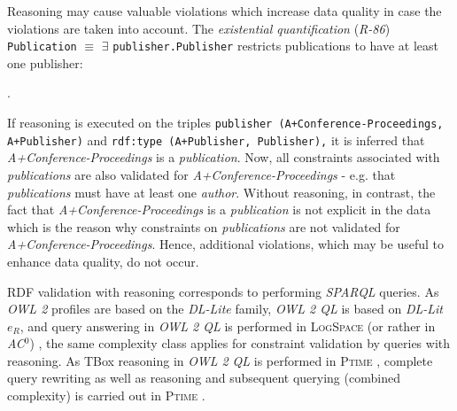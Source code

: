\documentclass{acm_proc_article-sp}
\newcommand{\ms}[1]{%
  \texttt{#1}
}
\begin{document}
Reasoning may cause valuable violations which increase data quality in case the violations are taken into account.
The {\em existential quantification} (\emph{R-86})
{\small\ms{Publication} \ms{$\equiv$} \ms{$\exists$} \ms{publisher.Publisher}} restricts publications to have at least one publisher: 
\begin{ex}
 .
\end{ex}
If reasoning is executed on the triples {\small\ms{publisher (A+Conference-Proceedings, A+Publisher)} and \ms{rdf:type (A+Publisher, Publisher),}} 
it is inferred that {\em A+Conference-Proceedings} is a {\em publication}.
Now, all constraints associated with {\em publications} are also validated for {\em A+Conference-Proceedings} - e.g. that \emph{publications} must have at least one \emph{author}.
Without reasoning, in contrast, the fact that \emph{A+Conference-Proceedings} is a \emph{publication} is not explicit in the data
which is the reason why constraints on {\em publications} are not validated for \emph{A+Conference-Proceedings}.
Hence, additional violations, which may be useful to enhance data quality, do not occur. 

RDF validation with reasoning corresponds to performing \emph{SPARQL} queries. 
As \emph{OWL 2} profiles are based on the \textit{DL-Lite} family,
\emph{OWL 2 QL} is based on \textit{DL-Lit}$e_R$,
and query answering in \emph{OWL 2 QL} is performed in \textsc{LogSpace} (or rather in \emph{AC$^0$}) \cite{Calvanese2007}, the same complexity class applies for
constraint validation by queries with reasoning.
As TBox reasoning in \emph{OWL 2 QL} is performed in \textsc{Ptime} \cite{Calvanese2007}, 
complete query rewriting as well as reasoning and subsequent querying (combined complexity) is carried out in \textsc{Ptime} \cite{Artale2009,Calvanese2007}.  

%
%
\end{document}
